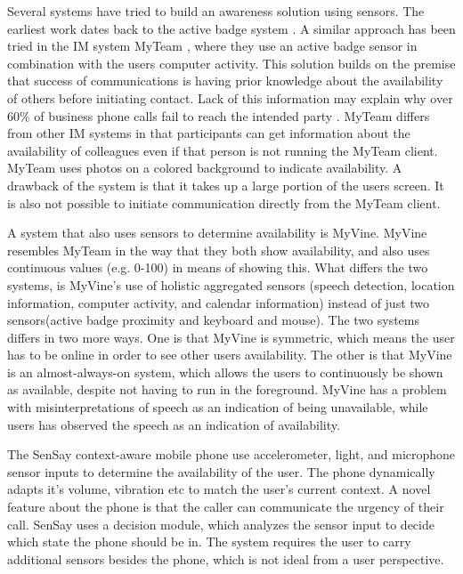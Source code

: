 \documentclass{sigchi}
\begin{document}
Several systems have tried to build an awareness solution using sensors.
The earliest work dates back to the active badge system \cite{want1992active}.
A similar approach has been tried in the IM system MyTeam \cite{lai2003myteam}, where they use an active badge sensor in combination with the users computer activity.
This solution builds on the premise that success of communications is having prior knowledge about the availability of others before initiating contact.
Lack of this information may explain why over 60\% of business phone calls fail to reach the intended party \cite{whittaker1995rethinking}.
MyTeam differs from other IM systems in that participants can get information about the availability of colleagues even if that person is not running the MyTeam client.
MyTeam uses photos on a colored background to indicate availability.
A drawback of the system is that it takes up a large portion of the users screen. It is also not possible to initiate communication directly from the MyTeam client.

A system that also uses sensors to determine availability is MyVine\cite{fogarty2004myvine}.
MyVine resembles MyTeam in the way that they both show availability, and also uses continuous values (e.g. 0-100) in means of showing this.
What differs the two systems, is MyVine’s use of holistic aggregated sensors (speech
detection, location information, computer activity, and calendar information) instead of just two sensors(active badge proximity and keyboard and mouse).
The two systems differs in two more ways.
One is that MyVine is symmetric, which means the user has to be online in order to see other users availability.
The other is that MyVine is an almost-always-on system, which allows the users to continuously be shown as available, despite not having to run in the foreground.
MyVine has a problem with misinterpretations of speech as an indication of being unavailable, while users has observed the speech as an indication of availability.

The SenSay context-aware mobile phone \cite{siewiorek2003sensay} use accelerometer, light, and microphone sensor inputs to determine the availability of the user.
The phone dynamically adapts it’s volume, vibration etc to match the user's current context.
A novel feature about the phone is that the caller can communicate the urgency of their call.
SenSay uses a decision module, which analyzes the sensor input to decide which state the phone should be in.
The system requires the user to carry additional sensors besides the phone, which is not ideal from a user perspective.
\end{document}

